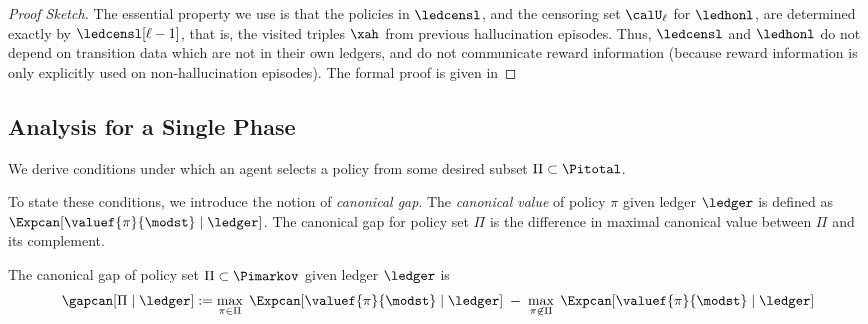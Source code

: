 \begin{proof}[Proof Sketch]
The essential property we use is that the policies in $\ledcensl$, and the censoring set $\calU_{\ell}$ for $\ledhonl$, are determined exactly by $\ledcensl[\ell-1]$, that is, the visited triples $\xah$ from previous hallucination episodes. Thus, $\ledcensl$ and $\ledhonl$ do not depend on transition data which are not in their own ledgers, and do not communicate reward information (because reward information is only explicitly used on non-hallucination episodes). The formal proof is given in 
\end{proof}

\subsection{Analysis for a Single Phase}
\label{sec:one_step}


We derive conditions under which an agent selects a policy from some desired subset $\Pi \subset \Pitotal$.




To state these conditions, we introduce the notion of \emph{canonical gap}. The \emph{canonical value} of policy $\pi$ given ledger $\ledger$ is defined as
    $\Expcan[\valuef{\pi}{\modst} \mid \ledger]$.
The canonical gap for policy set $\Pi$ is the difference in maximal canonical value between $\Pi$ and its complement.

\begin{definition}\label{defn:canonical_gap}
The canonical gap of policy set $\Pi \subset \Pimarkov$ given ledger $\ledger$ is
\begin{align*}
\gapcan[\Pi \mid \ledger] :=
    \max_{\pi \in \Pi}\; \Expcan[\valuef{\pi}{\modst} \mid \ledger]
    \;-\;
    \max_{\pi \not\in \Pi}\; \Expcan[\valuef{\pi}{\modst} \mid \ledger]
\end{align*}
\end{definition}

